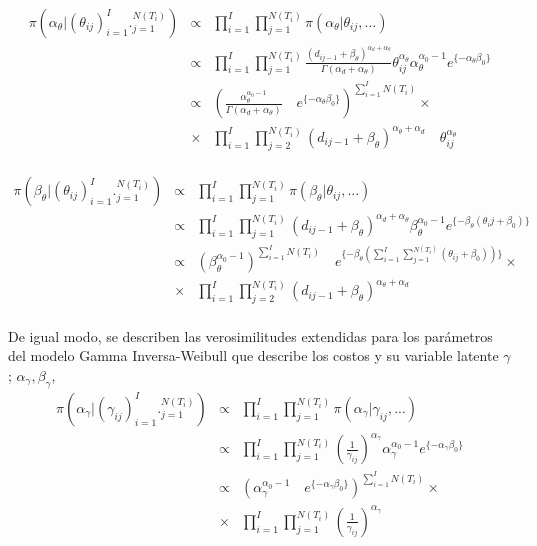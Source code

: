 \\
\begin{eqnarray*}
\pi(\alpha_\theta|(\theta_{ij})_{i=1}^I ._{j=1}^{N(T_i)})&\propto & \prod_{i=1}^I \prod_{j=1}^{N(T_i)} \pi(\alpha_\theta|\theta_{ij},...)\\
&\propto &\prod_{i=1}^I \prod_{j=1}^{N(T_i)} \frac{(d_{ij-1}+\beta_\theta)^{\alpha_d+\alpha_\theta}}{\Gamma(\alpha_d+\alpha_\theta)} \theta_{ij}^{\alpha_\theta}\alpha_\theta^{\alpha_0-1}e^{\{-\alpha_\theta\beta_0\}}\\
&\propto & \left(\frac{\alpha_\theta^{\alpha_0 -1}}{\Gamma(\alpha_d+\alpha_\theta)}\quad e^{\{-\alpha_\theta\beta_0\}}\right)^{\sum_{i=1}^I N(T_i)} \times \\
&\times & \prod_{i=1}^I \prod_{j=2}^{N(T_i)} (d_{ij-1}+\beta_\theta)^{\alpha_\theta+\alpha_d} \quad \theta_{ij}^{\alpha_\theta}
\end{eqnarray*}
\\
\begin{eqnarray*}
\pi(\beta_\theta|(\theta_{ij})_{i=1}^I ._{j=1}^{N(T_i)})&\propto & \prod_{i=1}^I \prod_{j=1}^{N(T_i)} \pi(\beta_\theta|\theta_{ij},...)\\
&\propto &\prod_{i=1}^I \prod_{j=1}^{N(T_i)} (d_{ij-1}+\beta_\theta)^{\alpha_d+\alpha_\theta}\beta_\theta^{\alpha_0-1} e^{\{-\beta_\theta(\theta_ij+\beta_0)\}}\\
&\propto & (\beta_\theta^{\alpha_0-1})^{\sum_{i=1}^I N(T_i)} \quad e^{\{-\beta_\theta(\sum_{i=1}^I \sum_{j=1}^{N(T_i)}(\theta_{ij}+\beta_0))\}} \times \\
&\times & \prod_{i=1}^I \prod_{j=2}^{N(T_i)} (d_{ij-1}+\beta_\theta)^{\alpha_\theta+\alpha_d}
\end{eqnarray*}
\\
De igual modo, se describen las verosimilitudes extendidas para los par\'ametros del modelo Gamma Inversa-Weibull que describe los costos y su variable latente $\gamma$; $\alpha_\gamma, \beta_\gamma$,
\begin{eqnarray*}
\pi(\alpha_\gamma|(\gamma_{ij})_{i=1}^I ._{j=1}^{N(T_i)})&\propto & \prod_{i=1}^I \prod_{j=1}^{N(T_i)} \pi(\alpha_\gamma|\gamma_{ij},...)\\
&\propto & \prod_{i=1}^I \prod_{j=1}^{N(T_i)} \left(\frac{1}{\gamma_{ij}}\right)^{\alpha_\gamma} \alpha_\gamma^{\alpha_0-1}e^{\{-\alpha_\gamma\beta_0\}}\\
&\propto & (\alpha_\gamma^{\alpha_0-1}\quad e^{\{-\alpha_\gamma \beta_0\}})^{\sum_{i=1}^I N(T_i)}  \times \\
&\times & \prod_{i=1}^I \prod_{j=1}^{N(T_i)}\left(\frac{1}{\gamma_{ij}}\right)^{\alpha_\gamma}
\end{eqnarray*}
